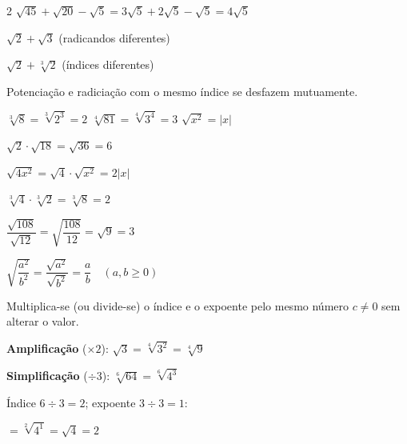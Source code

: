 \documentclass[12pt]{article}
\begin{document}
\begin{multicols}{2}
$\sqrt{45} + \sqrt{20} - \sqrt{5} = 3\sqrt{5} + 2\sqrt{5} - \sqrt{5} = 4\sqrt{5}$


$\sqrt{2} + \sqrt{3}$ \quad (radicandos diferentes)

$\sqrt{2} + \sqrt[3]{2}$ \quad (índices diferentes)




Potenciação e radiciação com o mesmo índice se desfazem mutuamente.

$\sqrt[3]{8} = \sqrt[3]{2^3} = 2$ \qquad $\sqrt[4]{81} = \sqrt[4]{3^4} = 3$ \qquad $\sqrt{x^2} = |x|$



$\sqrt{2} \cdot \sqrt{18} = \sqrt{36} = 6$

$\sqrt{4x^2} = \sqrt{4} \cdot \sqrt{x^2} = 2|x|$

$\sqrt[3]{4} \cdot \sqrt[3]{2} = \sqrt[3]{8} = 2$



$\dfrac{\sqrt{108}}{\sqrt{12}} = \sqrt{\dfrac{108}{12}} = \sqrt{9} = 3$ \vspace{6px}

$\sqrt{\dfrac{a^2}{b^2}} = \dfrac{\sqrt{a^2}}{\sqrt{b^2}} = \dfrac{a}{b} \quad (a,b \geq 0)$



Multiplica-se (ou divide-se) o índice e o expoente pelo mesmo número $c \neq 0$ sem alterar o valor.

\textbf{Amplificação} ($\times 2$): $\sqrt{3} = \sqrt[4]{3^2} = \sqrt[4]{9}$ \vspace{4px}

\textbf{Simplificação} ($\div 3$): $\sqrt[6]{64} = \sqrt[6]{4^3}$

Índice $6 \div 3 = 2$; expoente $3 \div 3 = 1$:

$= \sqrt[2]{4^1} = \sqrt{4} = 2$ \vspace{4px}


\end{multicols}
\end{document}
